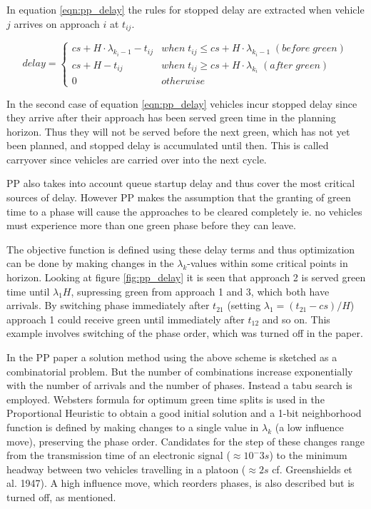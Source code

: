 In equation \ref{eqn:pp_delay} the rules for stopped delay are extracted when vehicle $j$ arrives on approach $i$ at $t_{ij}$.

\begin{equation}
delay = 
\begin{cases}
cs + H \cdot \lambda_{k_i-1} - t_{ij} & when \; t_{ij} \leq cs + H \cdot \lambda_{k_i-1} \; (before\;green)  \\
cs + H - t_{ij} & when \; t_{ij} \geq cs + H \cdot \lambda_{k_i} \; (after\;green)  \\
0 & otherwise
\end{cases}
\label{eqn:pp_delay}
\end{equation}

In the second case of equation \ref{eqn:pp_delay} vehicles incur stopped delay since they arrive after their approach has been served green time in the planning horizon. Thus they will not be served before the next green, which has not yet been planned, and stopped delay is accumulated until then. This is called carryover since vehicles are carried over into the next cycle.

PP also takes into account queue startup delay and thus cover the most critical sources of delay. However PP makes the assumption that the granting of green time to a phase will cause the approaches to be cleared completely ie. no vehicles must experience more than one green phase before they can leave.

The objective function is defined using these delay terms and thus optimization can be done by making changes in the $\lambda_k$-values within some critical points in horizon. Looking at figure \ref{fig:pp_delay} it is seen that approach 2 is served green time until $\lambda_1 H$, supressing green from approach 1 and 3, which both have arrivals. By switching phase immediately after $t_{21}$ (setting $\lambda_1 = (t_{21} - cs)/H$) approach 1 could receive green until immediately after $t_{12}$ and so on. This example involves switching of the phase order, which was turned off in the paper.

In the PP paper a solution method using the above scheme is sketched as a combinatorial problem. But the number of combinations increase exponentially with the number of arrivals and the number of phases. Instead a tabu search is employed. Websters formula for optimum green time splits is used in the Proportional Heuristic to obtain a good initial solution and a 1-bit neighborhood function is defined by making changes to a single value in $\lambda_k$ (a low influence move), preserving the phase order. Candidates for the step of these changes range from the transmission time of an electronic signal ($\approx 10^-3s$) to the minimum headway between two vehicles travelling in a platoon ($\approx 2s$ cf. Greenshields et al. 1947).
A high influence move, which reorders phases, is also described but is turned off, as mentioned.

